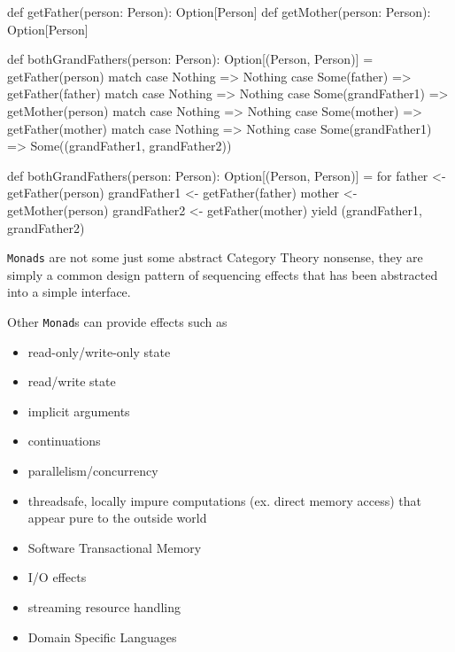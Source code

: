 \documentclass[12pt]{article}
\begin{document}
\begin{scala}
def getFather(person: Person): Option[Person]
def getMother(person: Person): Option[Person]

def bothGrandFathers(person: Person): Option[(Person, Person)] =
    getFather(person) match {
        case Nothing => Nothing
        case Some(father) => getFather(father) match {
          case Nothing => Nothing
          case Some(grandFather1) => getMother(person) match {
            case Nothing => Nothing
            case Some(mother) => getFather(mother) match {
              case Nothing => Nothing
              case Some(grandFather1) => Some((grandFather1, grandFather2))
            }
          }
        }
}

def bothGrandFathers(person: Person): Option[(Person, Person)] = for {
father       <- getFather(person)
grandFather1 <- getFather(father)
mother       <- getMother(person)
grandFather2 <- getFather(mother)
} yield (grandFather1, grandFather2)
\end{scala}
\newpage

\texttt{Monads} are not some just some abstract Category Theory nonsense, they
are simply a common design pattern of sequencing effects that has been
abstracted into a simple interface.

Other \texttt{Monad}s can provide effects such as
\begin{itemize}
    \item{read-only/write-only state}
    \item{read/write state}
    \item{implicit arguments}
    \item{continuations}
    \item{parallelism/concurrency}
    \item{threadsafe, locally impure computations (ex. direct memory access) that appear pure to the outside world}
    \item{Software Transactional Memory}
    \item{I/O effects}
    \item{streaming resource handling}
    \item{Domain Specific Languages}
\end{itemize}


\end{document}
